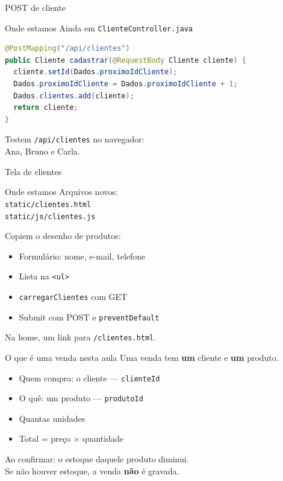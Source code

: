 \documentclass[aspectratio=169,11pt]{beamer}
\newcommand{\onde}[1]{%
  \begin{block}{Onde estamos}
    #1
  \end{block}
}
\begin{document}
\begin{frame}[fragile]{POST de cliente}
  \onde{Ainda em \texttt{ClienteController.java}}

\begin{lstlisting}[language=Java,basicstyle=\ttfamily\footnotesize]
@PostMapping("/api/clientes")
public Cliente cadastrar(@RequestBody Cliente cliente) {
  cliente.setId(Dados.proximoIdCliente);
  Dados.proximoIdCliente = Dados.proximoIdCliente + 1;
  Dados.clientes.add(cliente);
  return cliente;
}
\end{lstlisting}

  Testem \texttt{/api/clientes} no navegador:\\
  Ana, Bruno e Carla.
\end{frame}

\begin{frame}{Tela de clientes}
  \onde{Arquivos novos:\\
        \texttt{static/clientes.html}\\
        \texttt{static/js/clientes.js}}

  Copiem o desenho de produtos:

  \vspace{0.3em}
  \begin{itemize}
    \item Formulário: nome, e-mail, telefone
    \item Lista na \texttt{<ul>}
    \item \texttt{carregarClientes} com GET
    \item Submit com POST e \texttt{preventDefault}
  \end{itemize}

  \vspace{0.4em}
  Na home, um link para \texttt{/clientes.html}.
\end{frame}

\begin{frame}{O que é uma venda nesta aula}
  Uma venda tem \textbf{um} cliente e \textbf{um} produto.

  \vspace{0.5em}
  \begin{itemize}
    \item Quem compra: o cliente --- \texttt{clienteId}
    \item O quê: um produto --- \texttt{produtoId}
    \item Quantas unidades
    \item Total = preço $\times$ quantidade
  \end{itemize}

  \vspace{0.5em}
  Ao confirmar: o estoque daquele produto diminui.\\
  Se não houver estoque, a venda \textbf{não} é gravada.
\end{frame}
\end{document}
